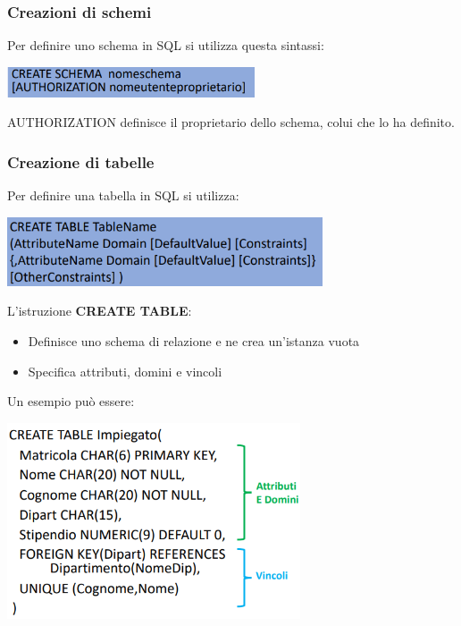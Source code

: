 \documentclass[12pt]{article}
\begin{document}
\subsubsection{Creazioni di schemi}
Per definire uno schema in SQL si utilizza questa sintassi:
\begin{center}
    \includegraphics[width = 0.55\textwidth]{Images/175.PNG}
\end{center}
AUTHORIZATION definisce il proprietario dello schema, colui che lo ha definito.
\subsubsection{Creazione di tabelle}
Per definire una tabella in SQL si utilizza:
\begin{center}
    \includegraphics[width = 0.70\textwidth]{Images/176.PNG}
\end{center}
L'istruzione \textbf{CREATE TABLE}:
\begin{itemize}
    \item Definisce uno schema di relazione e ne crea un'istanza vuota
    \item Specifica attributi, domini e vincoli
\end{itemize}
Un esempio può essere:
\begin{center}
    \includegraphics[width = 0.65\textwidth]{Images/177.PNG}
\end{center}
\end{document}
